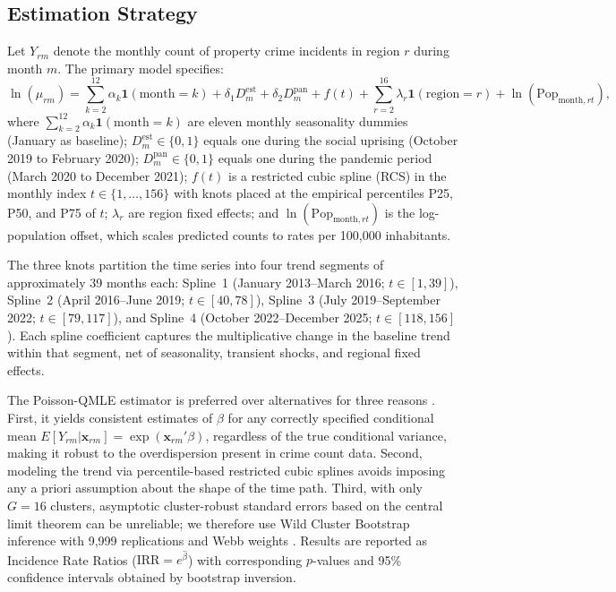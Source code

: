 \documentclass[pdflatex,sn-basic]{sn-jnl}
\begin{document}
\subsection{Estimation Strategy}

Let $Y_{rm}$ denote the monthly count of property crime incidents in region $r$ during month $m$. The primary model specifies:
\begin{equation}
  \ln(\mu_{rm})
  = \sum_{k=2}^{12} \alpha_k \mathbf{1}(\text{month}=k)
  + \delta_1 D^{\text{est}}_m + \delta_2 D^{\text{pan}}_m
  + f(t) + \sum_{r=2}^{16} \lambda_r \mathbf{1}(\text{region}=r)
  + \ln(\text{Pop}_{\text{month},rt}),
  \label{eq:poisson}
\end{equation}
where $\sum_{k=2}^{12}\alpha_k\mathbf{1}(\text{month}=k)$ are eleven monthly seasonality dummies (January as baseline); $D^{\text{est}}_m \in \{0,1\}$ equals one during the social uprising (October 2019 to February 2020); $D^{\text{pan}}_m \in \{0,1\}$ equals one during the pandemic period (March 2020 to December 2021); $f(t)$ is a restricted cubic spline (RCS) in the monthly index $t \in \{1,\ldots,156\}$ with knots placed at the empirical percentiles P25, P50, and P75 of $t$; $\lambda_r$ are region fixed effects; and $\ln(\text{Pop}_{\text{month},rt})$ is the log-population offset, which scales predicted counts to rates per 100,000 inhabitants.

The three knots partition the time series into four trend segments of approximately 39 months each: Spline~1 (January 2013--March 2016; $t \in [1,39]$), Spline~2 (April 2016--June 2019; $t \in [40,78]$), Spline~3 (July 2019--September 2022; $t \in [79,117]$), and Spline~4 (October 2022--December 2025; $t \in [118,156]$). Each spline coefficient captures the multiplicative change in the baseline trend within that segment, net of seasonality, transient shocks, and regional fixed effects.

The Poisson-QMLE estimator is preferred over alternatives for three reasons \citep{gourieroux1984,wooldridge2010,osgood2000,silvatenenreyro2006}. First, it yields consistent estimates of $\beta$ for any correctly specified conditional mean $E[Y_{rm}|\mathbf{x}_{rm}] = \exp(\mathbf{x}_{rm}'\beta)$, regardless of the true conditional variance, making it robust to the overdispersion present in crime count data. Second, modeling the trend via percentile-based restricted cubic splines avoids imposing any a priori assumption about the shape of the time path. Third, with only $G = 16$ clusters, asymptotic cluster-robust standard errors based on the central limit theorem can be unreliable; we therefore use Wild Cluster Bootstrap inference with 9,999 replications and Webb weights \citep{cameron2015,mackinnon2023}. Results are reported as Incidence Rate Ratios ($\text{IRR} = e^{\hat\beta}$) with corresponding $p$-values and 95\% confidence intervals obtained by bootstrap inversion.
\end{document}
